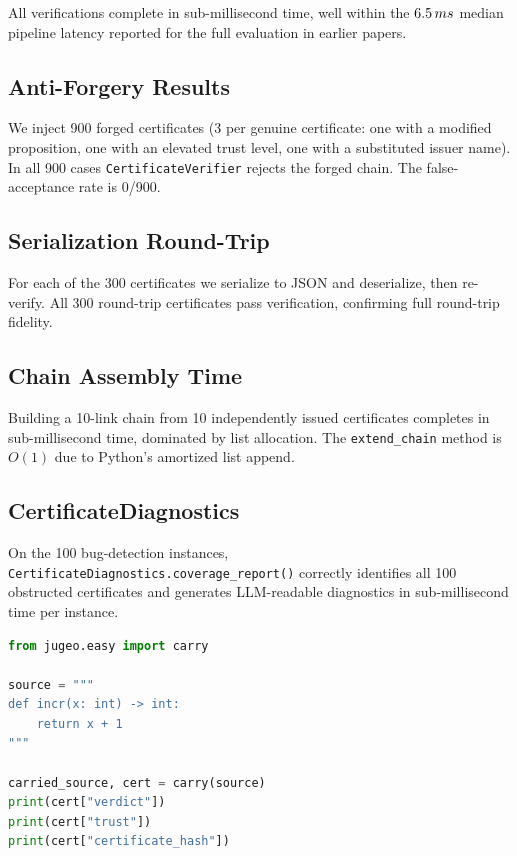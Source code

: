\documentclass[11pt]{article}
\begin{document}
All verifications complete in sub-millisecond time, well within the
$6.5\,ms{}$ median pipeline latency reported for the full \JuGeo{}
evaluation in earlier papers.

\subsection{Anti-Forgery Results}

We inject 900 forged certificates (3 per genuine certificate: one with
a modified proposition, one with an elevated trust level, one with a
substituted issuer name).
In all 900 cases \texttt{CertificateVerifier} rejects the forged chain.
The false-acceptance rate is 0/900.

\subsection{Serialization Round-Trip}

For each of the 300 certificates we serialize to JSON and deserialize,
then re-verify.  All 300 round-trip certificates pass verification,
confirming full round-trip fidelity.

\subsection{Chain Assembly Time}

Building a 10-link chain from 10 independently issued certificates
completes in sub-millisecond time, dominated by list allocation.
The \texttt{extend\_chain} method is $O(1)$ due to Python's amortized
list append.

\subsection{CertificateDiagnostics}

On the 100 bug-detection instances, \texttt{CertificateDiagnostics.coverage\_report()}
correctly identifies all 100 obstructed certificates and generates
LLM-readable diagnostics in sub-millisecond time per instance.

\begin{lstlisting}[language=Python, caption={JuGeo's proof-carrying interface via the installed easy API.}]
from jugeo.easy import carry

source = """
def incr(x: int) -> int:
    return x + 1
"""

carried_source, cert = carry(source)
print(cert["verdict"])
print(cert["trust"])
print(cert["certificate_hash"])
\end{lstlisting}
\end{document}
